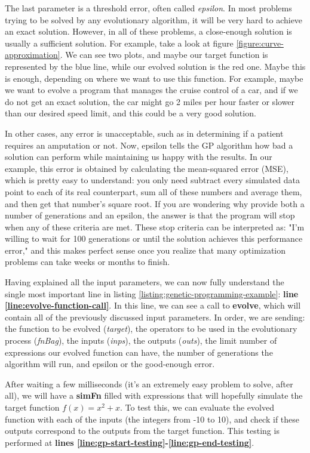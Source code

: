 \documentclass[11pt,fleqn,openany]{book} %
\begin{document}
The last parameter is a threshold error, often called \emph{epsilon}. In most problems trying to be solved by any evolutionary algorithm, it will be very hard to achieve an exact solution. However, in all of these problems, a close-enough solution is usually a sufficient solution. For example, take a look at figure \ref{figure:curve-approximation}. We can see two plots, and maybe our target function is represented by the blue line, while our evolved solution is the red one. Maybe this is enough, depending on where we want to use this function. For example, maybe we want to evolve a program that manages the cruise control of a car, and if we do not get an exact solution, the car might go 2 miles per hour faster or slower than our desired speed limit, and this could be a very good solution.

In other cases, any error is unacceptable, such as in determining if a patient requires an amputation or not. Now, epsilon tells the GP algorithm how bad a solution can perform while maintaining us happy with the results. In our example, this error is obtained by calculating the mean-squared error (MSE), which is pretty easy to understand: you only need subtract every simulated data point to each of its real counterpart, sum all of these numbers and average them, and then get that number's square root. If you are wondering why provide both a number of generations and an epsilon, the answer is that the program will stop when any of these criteria are met. These stop criteria can be interpreted as: "I'm willing to wait for 100 generations or until the solution achieves this performance error," and this makes perfect sense once you realize that many optimization problems can take weeks or months to finish.

Having explained all the input parameters, we can now fully understand the single most important line in listing \ref{listing:genetic-programming-example}: \textbf{line \ref{line:evolve-function-call}}. In this line, we can see a call to \textbf{evolve}, which will contain all of the previously discussed input parameters. In order, we are sending: the function to be evolved (\emph{target}), the operators to be used in the evolutionary process (\emph{fnBag}), the inputs (\emph{inps}), the outputs (\emph{outs}), the limit number of expressions our evolved function can have, the number of generations the algorithm will run, and epsilon or the good-enough error.

After waiting a few milliseconds (it's an extremely easy problem to solve, after all), we will have a \textbf{simFn} filled with expressions that will hopefully simulate the target function $f(x) = x^2 + x$. To test this, we can evaluate the evolved function with each of the inputs (the integers from -10 to 10), and check if these outputs correspond to the outputs from the target function. This testing is performed at \textbf{lines \ref{line:gp-start-testing}-\ref{line:gp-end-testing}}.
\end{document}
